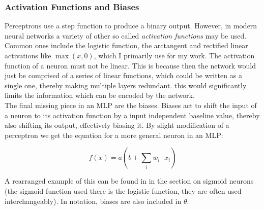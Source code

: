 \subsubsection{Activation Functions and Biases}\label{subsubsec:nn:comp:activation}
Perceptrons use a step function to produce a binary output. However, in modern neural networks a variety of other so called \textit{activation functions} may be used. Common ones include the logistic function, the arctangent and rectified linear activations like $\max(x, 0)$, which I primarily use for my work. The activation function of a neuron must not be linear. This is because then the network would just be comprised of a series of linear functions, which could be written as a single one, thereby making multiple layers redundant. this would significantly limits the information which can be encoded by the network. 
\noindent
\\ The final missing piece in an MLP are the biases. Biases act to shift the input of a neuron to its activation function by a input independent baseline value, thereby also shifting its output, effectively biasing it. By slight modification of a perceptron we get the equation for a more general neuron in an MLP:

\begin{equation}\label{neuron}
    f(x) = a(b + \sum_i w_i \cdot x_i)
\end{equation}

\noindent
A rearranged example of this can be found in \cite[chap. 1]{nielsen_neural_2015} in the section on sigmoid neurons (the sigmoid function used there is the logistic function, they are often used interchangeably). In notation, biases are also included in $\theta$.
